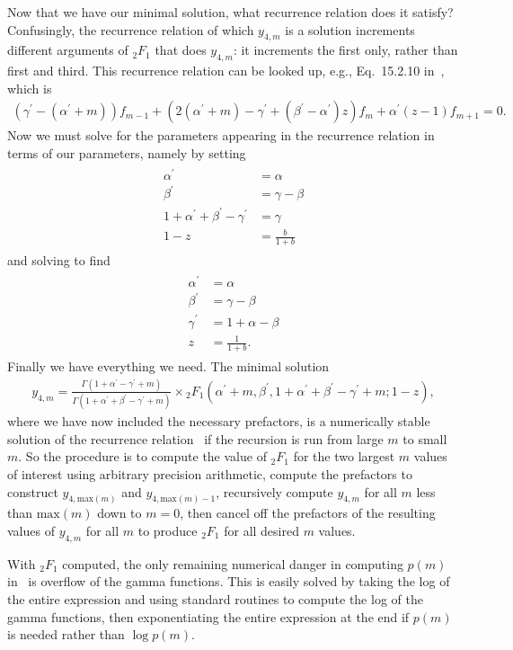 Now that we have our minimal solution,
what recurrence relation does it satisfy?
Confusingly, the recurrence relation of which $y_{4,m}$ is a solution
increments different arguments of ${_2F_1}$ that does $y_{4,m}$:
it increments the first only, rather than first and third.
This recurrence relation can be looked up, e.g., Eq.~15.2.10
in~\cite{Abramowitz1964}, which is
\begin{align}
(\gamma^\prime - (\alpha^\prime + m)) f_{m-1}
+
(2(\alpha^\prime+m) - \gamma^\prime + (\beta^\prime - \alpha^\prime)z)f_m
+ \alpha^\prime(z-1) f_{m+1} = 0.
\label{eq:chosen_rec_rel}
\end{align}
Now we must solve for the parameters appearing in the recurrence relation
in terms of our parameters, namely by setting
\begin{align}
\begin{split}
\alpha^\prime &= \alpha
\\
\beta^\prime &= \gamma - \beta
\\
1 + \alpha^\prime + \beta^\prime - \gamma^\prime &= \gamma
\\
1 - z &= \frac{b}{1+b}
\end{split}
\end{align}
and solving to find
\begin{align}
\begin{split}
\alpha^\prime &= \alpha
\\
\beta^\prime &= \gamma - \beta
\\
\gamma^\prime &= 1 + \alpha - \beta
\\
z &= \frac{1}{1+b}
.
\end{split}
\end{align}
Finally we have everything we need. The minimal solution
\begin{align}
y_{4,m}
=
\frac{\Gamma(1+\alpha^\prime-\gamma^\prime+m)}
        {\Gamma(1+\alpha^\prime+\beta^\prime-\gamma^\prime+m)}
\times
{_2F_1}\left(\alpha^\prime + m,
                \beta^\prime,
                1+\alpha^\prime+\beta^\prime-\gamma^\prime+m;
                1-z\right),
\end{align}
where we have now included the necessary prefactors,
is a numerically stable solution of the recurrence
relation~ if the recursion is run
from large $m$ to small $m$.
So the procedure is to compute the value of ${_2F_1}$ for the two
largest $m$ values of interest using arbitrary precision arithmetic,
compute the prefactors to construct
$y_{4,\text{max}(m)}$ and $y_{4,\text{max}(m)-1}$,
recursively compute $y_{4,m}$ for all $m$ less than $\text{max}(m)$ down
to $m=0$, then cancel off the prefactors of the resulting values of
$y_{4,m}$ for all $m$ to produce ${_2F_1}$ for all desired $m$ values.

With ${_2F_1}$ computed, the only remaining numerical danger in computing
$p(m)$ in~ is overflow of the gamma functions.
This is easily solved by taking the log of the entire expression
and using standard routines to compute the log of the gamma functions,
then exponentiating the entire expression at the end if $p(m)$
is needed rather than $\log p(m)$.